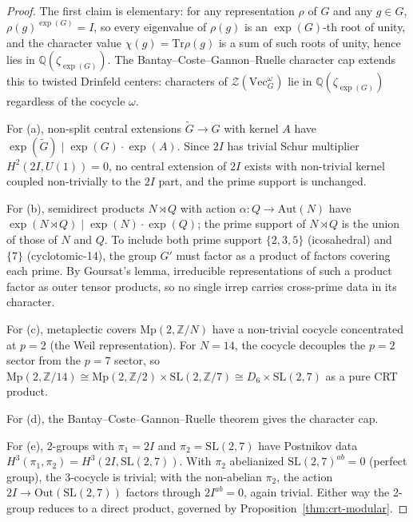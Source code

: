 \documentclass[11pt,a4paper]{amsart}
\theoremstyle{definition}
\theoremstyle{remark}
\newcommand{\SL}{\mathrm{SL}}
\newcommand{\Mp}{\mathrm{Mp}}
\newcommand{\Aut}{\mathrm{Aut}}
\newcommand{\Out}{\mathrm{Out}}
\newcommand{\Tr}{\mathrm{Tr}}
\newcommand{\VecCat}{\mathrm{Vec}}
\newcommand{\bbZ}{\mathbb{Z}}
\newcommand{\bbQ}{\mathbb{Q}}
\begin{document}
\begin{proof}
The first claim is elementary: for any representation $\rho$ of $G$ and any
$g \in G$, $\rho(g)^{\exp(G)} = I$, so every eigenvalue of $\rho(g)$ is an
$\exp(G)$-th root of unity, and the character value $\chi(g) = \Tr \rho(g)$
is a sum of such roots of unity, hence lies in $\bbQ(\zeta_{\exp(G)})$. The
Bantay--Coste--Gannon--Ruelle
character cap \cite{Bantay2002, CosteGannonRuelle2000} extends this to
twisted Drinfeld centers: characters of $\mathcal{Z}(\VecCat_G^\omega)$ lie in
$\bbQ(\zeta_{\exp(G)})$ regardless of the cocycle $\omega$.

For (a), non-split central extensions $\tilde G \to G$ with kernel $A$ have
$\exp(\tilde G) \mid \exp(G) \cdot \exp(A)$. Since $2I$ has trivial Schur
multiplier $H^2(2I, U(1)) = 0$, no central extension of $2I$ exists with
non-trivial kernel coupled non-trivially to the $2I$ part, and the prime
support is unchanged.

For (b), semidirect products $N \rtimes Q$ with action $\alpha: Q \to \Aut(N)$
have $\exp(N \rtimes Q) \mid \exp(N) \cdot \exp(Q)$; the prime support of
$N \rtimes Q$ is the union of those of $N$ and $Q$. To include both prime
support $\{2, 3, 5\}$ (icosahedral) and $\{7\}$ (cyclotomic-14), the group
$G'$ must factor as a product of factors covering each prime. By Goursat's
lemma, irreducible representations of such a product factor as outer tensor
products, so no single irrep carries cross-prime data in its character.

For (c), metaplectic covers $\Mp(2, \bbZ/N)$ have a non-trivial cocycle
concentrated at $p = 2$ (the Weil representation). For $N = 14$, the cocycle
decouples the $p = 2$ sector from the $p = 7$ sector, so
$\Mp(2, \bbZ/14) \cong \Mp(2, \bbZ/2) \times \SL(2, \bbZ/7) \cong D_6 \times \SL(2,7)$
as a pure CRT product.

For (d), the Bantay--Coste--Gannon--Ruelle theorem gives the character cap.

For (e), 2-groups with $\pi_1 = 2I$ and $\pi_2 = \SL(2,7)$ have Postnikov
data $H^3(\pi_1, \pi_2) = H^3(2I, \SL(2,7))$. With $\pi_2$ abelianized
$\SL(2,7)^{ab} = 0$ (perfect group), the 3-cocycle is trivial; with the
non-abelian $\pi_2$, the action $2I \to \Out(\SL(2,7))$ factors through
$2I^{ab} = 0$, again trivial. Either way the 2-group reduces to a direct
product, governed by Proposition~\ref{thm:crt-modular}.
\end{proof}
\end{document}
